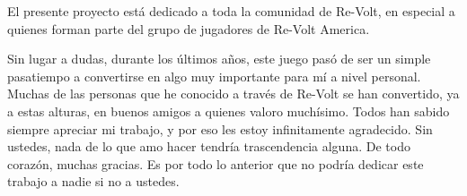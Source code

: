 El presente proyecto está dedicado a toda la comunidad de Re-Volt, en especial a quienes forman parte del grupo de jugadores de Re-Volt America.

Sin lugar a dudas, durante los últimos años, este juego pasó de ser un simple pasatiempo a convertirse en algo muy importante para mí a nivel personal. Muchas de las personas que he conocido a través de Re-Volt se han convertido, ya a estas alturas, en buenos amigos a quienes valoro muchísimo. Todos han sabido siempre apreciar mi trabajo, y por eso les estoy infinitamente agradecido. Sin ustedes, nada de lo que amo hacer tendría trascendencia alguna. De todo corazón, muchas gracias. Es por todo lo anterior que no podría dedicar este trabajo a nadie si no a ustedes.
